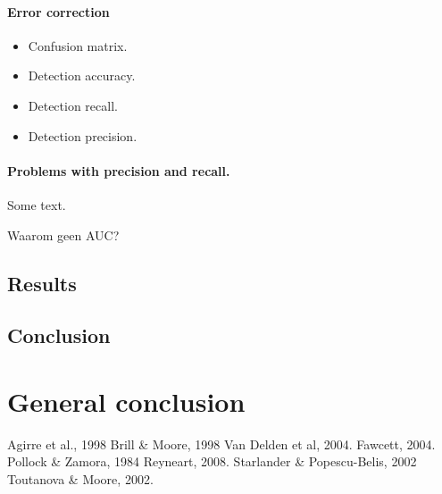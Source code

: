 \documentclass[12pt]{article}
\let\stdsection\section
\renewcommand\section{\newpage\stdsection}
\begin{document}
\paragraph{Error correction}

\begin{itemize}
\item Confusion matrix.
\item Detection accuracy.
\item Detection recall.
\item Detection precision.
\end{itemize}

\paragraph{Problems with precision and recall.} Some text.

Waarom geen AUC?

\subsection{Results}

\subsection{Conclusion}

\section{General conclusion}

\begin{thebibliography}{99}

Agirre et al., 1998
Brill \& Moore, 1998
Van Delden et al, 2004.
Fawcett, 2004.
Pollock \& Zamora, 1984
Reyneart, 2008.
Starlander \& Popescu-Belis, 2002
Toutanova \& Moore, 2002.

\end{thebibliography}

\end{document}

